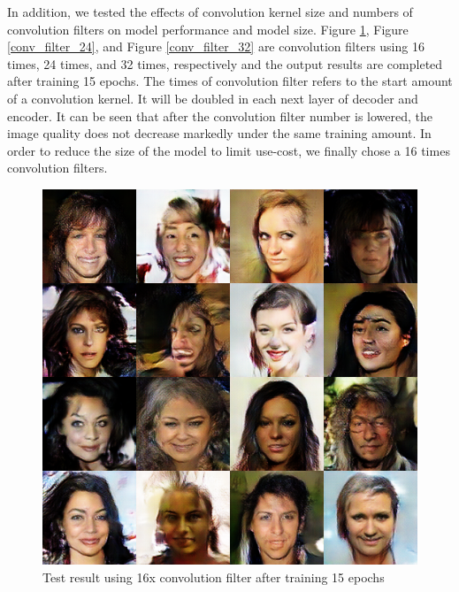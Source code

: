 In addition, we tested the effects of convolution kernel size and numbers of convolution filters on model performance and model size.
Figure \ref{conv_filter_16}, Figure \ref{conv_filter_24}, and Figure \ref{conv_filter_32} are convolution filters using 16 times, 24 times, and 32 times,
    respectively and the output results are completed after training 15 epochs.
The times of convolution filter refers to the start amount of a convolution kernel.
It will be doubled in each next layer of decoder and encoder.
It can be seen that after the convolution filter number is lowered,
    the image quality does not decrease markedly under the same training amount.
In order to reduce the size of the model to limit use-cost,
    we finally chose a 16 times convolution filters.

\begin{figure}
    \begin{minipage}[t]{0.48\linewidth}
        \centering
        \includegraphics[width=\textwidth]{figures/result_conv_filter_16.png}
        \caption{Test result using 16x convolution filter after training 15 epochs}
        \label{conv_filter_16}
    \end{minipage}
        \hfill
    \begin{minipage}[t]{0.48\linewidth}
        \centering

\end{minipage}
\end{figure}
